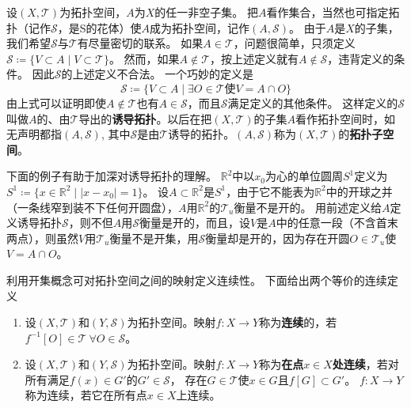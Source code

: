 \begin{example}
	设$(X, \mathscr{T})$为拓扑空间，$A$为$X$的任一非空子集。
	把$A$看作集合，当然也可指定拓扑（记作$\mathscr{S}$，是S的花体）使$A$成为拓扑空间，记作$(A, \mathscr{S})$。
	由于$A$是$X$的子集，我们希望$\mathscr{S}$与$\mathscr{T}$有尽量密切的联系。
	如果$A \in \mathscr{T}$，问题很简单，只须定义$\mathscr{S} \coloneq \{V \subset A \mid V \subset \mathscr{T}\}$。
	然而，如果$A \notin \mathscr{T}$，按上述定义就有$A \notin \mathscr{S}$，违背定义的条件。
	因此$\mathscr{S}$的上述定义不合法。
	一个巧妙的定义是
	$$\mathscr{S} \coloneq \{V \subset A \mid \exists O \in \mathscr{T} \text{使} V = A \cap O\}$$
	由上式可以证明即使$A \notin \mathscr{T}$也有$A \in \mathscr{S}$，而且$\mathscr{S}$满足定义的其他条件。
	这样定义的$\mathscr{S}$叫做$A$的、由$\mathscr{T}$导出的\textbf{诱导拓扑}。以后在把$(X, \mathscr{T})$的子集$A$看作拓扑空间时，如无声明都指$(A, \mathscr{S})$,
	其中$\mathscr{S}$是由$\mathscr{T}$诱导的拓扑。$(A, \mathscr{S})$称为$(X, \mathscr{T})$的\textbf{拓扑子空间}。
\end{example}

下面的例子有助于加深对诱导拓扑的理解。
$\mathbb{R}^2$中以$x_0$为心的单位圆周$S^1$定义为$S^1 \coloneq \{x \in \mathbb{R}^2 \mid |x - x_0| = 1\}$。
设$A \subset \mathbb{R}^2$是$S^1$，由于它不能表为$\mathbb{R}^2$中的开球之并（一条线窄到装不下任何开圆盘），$A$用$\mathbb{R}^2$的$\mathscr{T}_u$衡量不是开的。
用前述定义给$A$定义诱导拓扑$\mathscr{S}$，则不但$A$用$\mathscr{S}$衡量是开的，而且，设$V$是$A$中的任意一段（不含首末两点），则虽然$V$用$\mathscr{T}_u$衡量不是开集，用$\mathscr{S}$衡量却是开的，因为存在开圆$O \in \mathscr{T}_u$使$V = A \cap O$。

利用开集概念可对拓扑空间之间的映射定义连续性。
下面给出两个等价的连续定义

\begin{definition}
	\begin{enumerate}[（a）]
		\item 设$(X, \mathscr{T})$和$(Y, \mathscr{S})$为拓扑空间。映射$f \colon X \to Y$称为\textbf{连续}的，若$f^{-1}[O] \in \mathscr{T} ~ \forall O \in \mathscr{S}$。
		\item 设$(X, \mathscr{T})$和$(Y, \mathscr{S})$为拓扑空间。映射$f \colon X \to Y$称为\textbf{在点$x \in X$处连续}，若对所有满足$f(x) \in G'$的$G' \in \mathscr{S}$， 存在$G \in \mathscr{T}$使$x \in G$且$f[G] \subset G'$。
		      $f \colon X \to Y$称为连续，若它在所有点$x \in X$上连续。
	\end{enumerate}
\end{definition}

